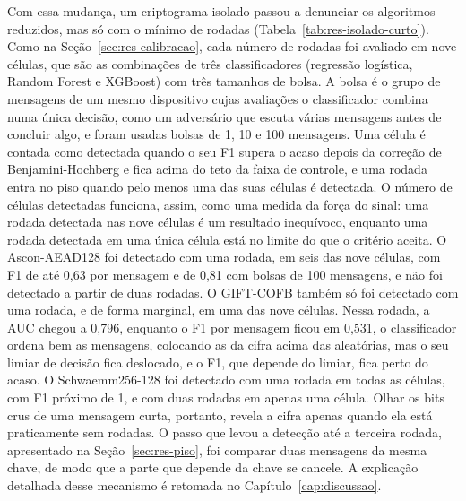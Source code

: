 Com essa mudança, um criptograma isolado passou a denunciar os algoritmos reduzidos, mas só com o mínimo de rodadas (Tabela~\ref{tab:res-isolado-curto}). Como na Seção~\ref{sec:res-calibracao}, cada número de rodadas foi avaliado em nove células, que são as combinações de três classificadores (regressão logística, Random Forest e XGBoost) com três tamanhos de bolsa. A bolsa é o grupo de mensagens de um mesmo dispositivo cujas avaliações o classificador combina numa única decisão, como um adversário que escuta várias mensagens antes de concluir algo, e foram usadas bolsas de 1, 10 e 100 mensagens. Uma célula é contada como detectada quando o seu F1 supera o acaso depois da correção de Benjamini-Hochberg e fica acima do teto da faixa de controle, e uma rodada entra no piso quando pelo menos uma das suas células é detectada. O número de células detectadas funciona, assim, como uma medida da força do sinal: uma rodada detectada nas nove células é um resultado inequívoco, enquanto uma rodada detectada em uma única célula está no limite do que o critério aceita. O Ascon-AEAD128 foi detectado com uma rodada, em seis das nove células, com F1 de até 0,63 por mensagem e de 0,81 com bolsas de 100 mensagens, e não foi detectado a partir de duas rodadas. O GIFT-COFB também só foi detectado com uma rodada, e de forma marginal, em uma das nove células. Nessa rodada, a AUC chegou a 0,796, enquanto o F1 por mensagem ficou em 0,531, o classificador ordena bem as mensagens, colocando as da cifra acima das aleatórias, mas o seu limiar de decisão fica deslocado, e o F1, que depende do limiar, fica perto do acaso. O Schwaemm256-128 foi detectado com uma rodada em todas as células, com F1 próximo de 1, e com duas rodadas em apenas uma célula. Olhar os bits crus de uma mensagem curta, portanto, revela a cifra apenas quando ela está praticamente sem rodadas. O passo que levou a detecção até a terceira rodada, apresentado na Seção~\ref{sec:res-piso}, foi comparar duas mensagens da mesma chave, de modo que a parte que depende da chave se cancele. A explicação detalhada desse mecanismo é retomada no Capítulo~\ref{cap:discussao}.

